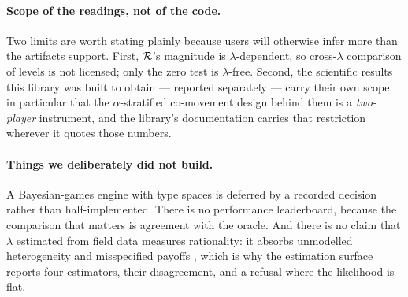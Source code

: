 \paragraph{Scope of the readings, not of the code.} Two limits are worth stating
plainly because users will otherwise infer more than the artifacts support.
First, $\mathcal{R}$'s magnitude is $\lambda$-dependent, so cross-$\lambda$ comparison of
levels is not licensed; only the zero test is $\lambda$-free. Second, the
scientific results this library was built to obtain --- reported separately
\citep{p2} --- carry their own scope, in particular that the $\alpha$-stratified
co-movement design behind them is a \emph{two-player} instrument, and the
library's documentation carries that restriction wherever it quotes those
numbers.

\paragraph{Things we deliberately did not build.} A Bayesian-games engine with
type spaces is deferred by a recorded decision rather than half-implemented.
There is no performance leaderboard, because the comparison that matters is
agreement with the oracle. And there is no claim that $\lambda$ estimated from
field data measures rationality: it absorbs unmodelled heterogeneity and
misspecified payoffs \citep{hhk2008}, which is why the estimation surface reports
four estimators, their disagreement, and a refusal where the likelihood is
flat.

